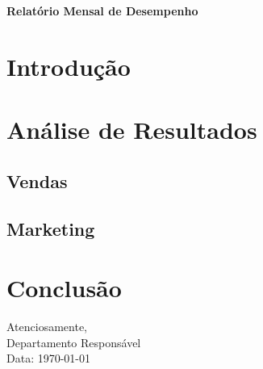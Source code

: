 \documentclass[11pt, a4paper]{article}
\newcommand{\documenttitle}[1]{%
    \vspace*{1.5cm} %
    \begin{center}
        \textsf{\color{corporateblue}\bfseries\Huge #1}
    \end{center}
    \vspace*{1cm} %
}
\begin{document}
\documenttitle{Relatório Mensal de Desempenho}

\section*{Introdução} %
\textsf{\color{corporategray}\lipsum[1]} %

\vspace{0.5cm} %

\section*{Análise de Resultados}
\textsf{\color{corporategray}\lipsum[2]} %

\subsection*{Vendas}
\textsf{\color{corporategray}\lipsum[3]} %

\subsection*{Marketing}
\textsf{\color{corporategray}\lipsum[4]} %

\section*{Conclusão}
\textsf{\color{corporategray}\lipsum[5]} %

\vspace{1cm} %
\begin{flushright}
    \textsf{\color{corporategray}Atenciosamente,}\\
    \textsf{\color{corporategray}Departamento Responsável}\\
    \textsf{\color{corporategray}Data: \today}
\end{flushright}
\end{document}
